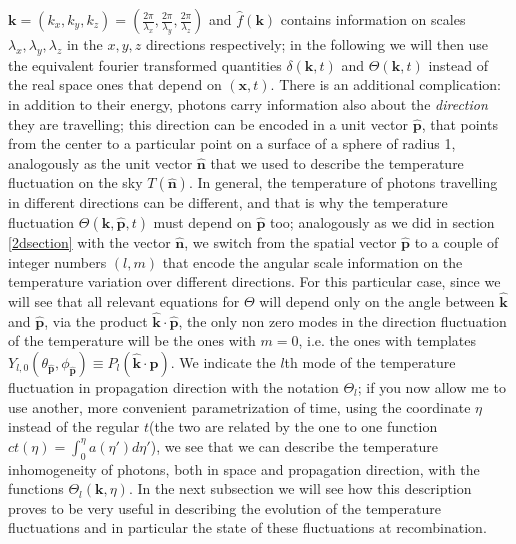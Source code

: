 $\mathbf{k}=(k_x,k_y,k_z)=\left(\frac{2\pi}{\lambda_x},\frac{2\pi}{\lambda_y},\frac{2\pi}{\lambda_z}\right)$ and $\hat{f}(\mathbf{k})$ contains information on scales $\lambda_x,\lambda_y,\lambda_z$ in the $x,y,z$ directions respectively; in the following we will then use the equivalent fourier transformed quantities $\delta(\mathbf{k},t)$ and $\Theta(\mathbf{k},t)$ instead of the real space ones that depend on $(\mathbf{x},t)$. There is an additional complication: in addition to their energy, photons carry information also about the \textit{direction} they are travelling; this direction can be encoded in a unit vector $\mathbf{\hat{p}}$, that points from the center to a particular point on a surface of a sphere of radius 1, analogously as the unit vector $\mathbf{\hat{n}}$ that we used to describe the temperature fluctuation on the sky $T(\mathbf{\hat{n}})$. In general, the temperature of photons travelling in different directions can be different, and that is why the temperature fluctuation $\Theta(\mathbf{
k},\mathbf{\hat{p}},t)$ must depend on $\mathbf{\hat{p}}$ too; analogously as we did in section \ref{2dsection} with the vector $\mathbf{\hat{n}}$, we switch from the spatial vector $\mathbf{\hat{p}}$ to a couple of integer numbers $(l,m)$ that encode the angular scale information on the temperature variation over different directions. For this particular case, since we will see that all relevant equations for $\Theta$ will depend only on the angle between $\mathbf{\hat{k}}$ and $\mathbf{\hat{p}}$, via the product $\mathbf{\hat{k}}\cdot\mathbf{\hat{p}}$, the only non zero modes in the direction fluctuation of the temperature will be the ones with $m=0$, i.e. the ones with templates $Y_{l,0}(\theta_{\mathbf{\hat{p}}},\phi_{\mathbf{\hat{p}}})\equiv P_l(\mathbf{\hat{k}}\cdot \mathbf{\hat{p}})$. We indicate the $l$th mode of the temperature fluctuation in propagation direction with the notation $\Theta_l$; if you now allow me to use another, more convenient parametrization of time, using the coordinate $\eta$ 
instead of the regular $t$(the two are related by the one to one function $ct(\eta)=\int_0^\eta a(\eta')d\eta'$), we see that we can describe the temperature inhomogeneity of photons, both in space and propagation direction, with the functions $\Theta_l(\mathbf{k},\eta)$. In the next subsection we will see how this description proves to be very useful in describing the evolution of the temperature fluctuations and in particular the state of these fluctuations at recombination. 
